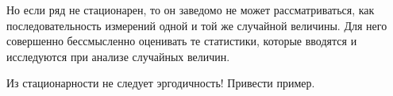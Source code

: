 Но если ряд не стационарен, то он заведомо не может
рассматриваться, как последовательность измерений одной и той же
случайной величины. Для него совершенно бессмысленно оценивать те
статистики, которые вводятся и исследуются при анализе случайных величин.

Из стационарности не следует эргодичность! Привести пример.

\printbibliography[heading=subbibliography, title={Источники}]